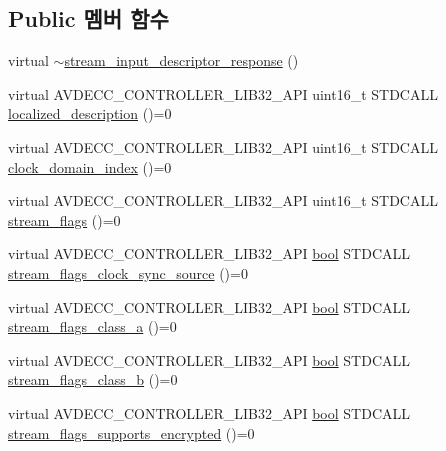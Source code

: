 \subsection*{Public 멤버 함수}
\begin{DoxyCompactItemize}
\item 
virtual \hyperlink{classavdecc__lib_1_1stream__input__descriptor__response_ac02d7578f08560de8520fc2cffb10e26}{$\sim$stream\+\_\+input\+\_\+descriptor\+\_\+response} ()
\item 
virtual A\+V\+D\+E\+C\+C\+\_\+\+C\+O\+N\+T\+R\+O\+L\+L\+E\+R\+\_\+\+L\+I\+B32\+\_\+\+A\+PI uint16\+\_\+t S\+T\+D\+C\+A\+LL \hyperlink{classavdecc__lib_1_1stream__input__descriptor__response_a1fb9de45567df344090a1407aa6b775f}{localized\+\_\+description} ()=0
\item 
virtual A\+V\+D\+E\+C\+C\+\_\+\+C\+O\+N\+T\+R\+O\+L\+L\+E\+R\+\_\+\+L\+I\+B32\+\_\+\+A\+PI uint16\+\_\+t S\+T\+D\+C\+A\+LL \hyperlink{classavdecc__lib_1_1stream__input__descriptor__response_aab7f93d403d8b73f8f4a8fb7c61ecded}{clock\+\_\+domain\+\_\+index} ()=0
\item 
virtual A\+V\+D\+E\+C\+C\+\_\+\+C\+O\+N\+T\+R\+O\+L\+L\+E\+R\+\_\+\+L\+I\+B32\+\_\+\+A\+PI uint16\+\_\+t S\+T\+D\+C\+A\+LL \hyperlink{classavdecc__lib_1_1stream__input__descriptor__response_aca4a27df506a50c80228271902f0091e}{stream\+\_\+flags} ()=0
\item 
virtual A\+V\+D\+E\+C\+C\+\_\+\+C\+O\+N\+T\+R\+O\+L\+L\+E\+R\+\_\+\+L\+I\+B32\+\_\+\+A\+PI \hyperlink{avb__gptp_8h_af6a258d8f3ee5206d682d799316314b1}{bool} S\+T\+D\+C\+A\+LL \hyperlink{classavdecc__lib_1_1stream__input__descriptor__response_a995e03199cdf8ff67b735e202ee731c9}{stream\+\_\+flags\+\_\+clock\+\_\+sync\+\_\+source} ()=0
\item 
virtual A\+V\+D\+E\+C\+C\+\_\+\+C\+O\+N\+T\+R\+O\+L\+L\+E\+R\+\_\+\+L\+I\+B32\+\_\+\+A\+PI \hyperlink{avb__gptp_8h_af6a258d8f3ee5206d682d799316314b1}{bool} S\+T\+D\+C\+A\+LL \hyperlink{classavdecc__lib_1_1stream__input__descriptor__response_a12f7c478a280c8847869fc1effda0ac9}{stream\+\_\+flags\+\_\+class\+\_\+a} ()=0
\item 
virtual A\+V\+D\+E\+C\+C\+\_\+\+C\+O\+N\+T\+R\+O\+L\+L\+E\+R\+\_\+\+L\+I\+B32\+\_\+\+A\+PI \hyperlink{avb__gptp_8h_af6a258d8f3ee5206d682d799316314b1}{bool} S\+T\+D\+C\+A\+LL \hyperlink{classavdecc__lib_1_1stream__input__descriptor__response_a0c1c9fe75737c0690cefe1597cf0d2f5}{stream\+\_\+flags\+\_\+class\+\_\+b} ()=0
\item 
virtual A\+V\+D\+E\+C\+C\+\_\+\+C\+O\+N\+T\+R\+O\+L\+L\+E\+R\+\_\+\+L\+I\+B32\+\_\+\+A\+PI \hyperlink{avb__gptp_8h_af6a258d8f3ee5206d682d799316314b1}{bool} S\+T\+D\+C\+A\+LL \hyperlink{classavdecc__lib_1_1stream__input__descriptor__response_acf3491baaac1909aeeea303407a15b47}{stream\+\_\+flags\+\_\+supports\+\_\+encrypted} ()=0

\end{DoxyCompactItemize}

